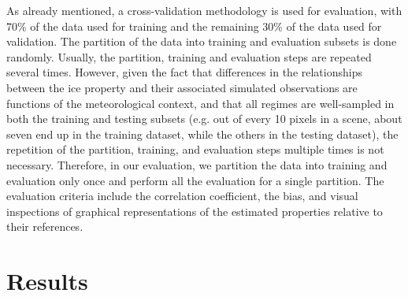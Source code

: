 \documentclass{ametsocV6.1}
\begin{document}
As already mentioned, a cross-validation methodology is used for evaluation, with 70\% of 
the data used for training and the remaining 30\% of the data used for validation.  The partition of the data into 
training and 
evaluation subsets is done randomly.  Usually, the partition, training and evaluation steps are repeated 
several times.  However, given the fact that differences in the relationships between the ice property and 
their associated simulated observations are functions of the meteorological context, and that all regimes are 
well-sampled in both the training and testing subsets (e.g. out of every 10 pixels in a scene, about seven end up 
in the training dataset, while the others in the testing dataset), the repetition of the partition, training, 
and evaluation steps multiple times is not necessary. Therefore, in our evaluation, we partition the data into 
training and evaluation only once and perform all the evaluation for a single partition. The evaluation 
criteria include the correlation coefficient, the bias, and visual inspections of graphical representations of 
the estimated properties relative to their references.

\section{Results}
\end{document}
